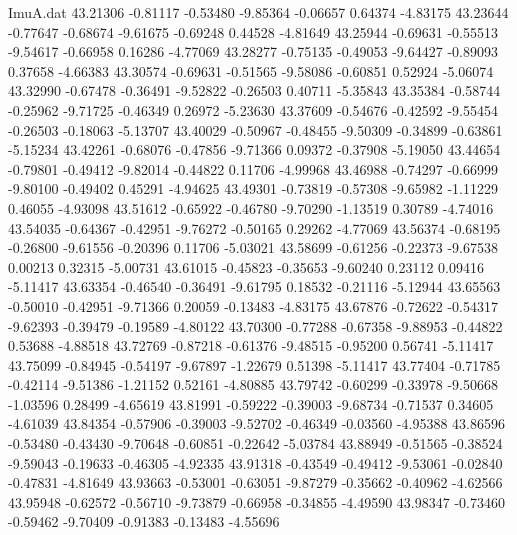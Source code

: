 \begin{filecontents}{ImuA.dat}
  43.21306   -0.81117   -0.53480   -9.85364   -0.06657    0.64374   -4.83175
  43.23644   -0.77647   -0.68674   -9.61675   -0.69248    0.44528   -4.81649
  43.25944   -0.69631   -0.55513   -9.54617   -0.66958    0.16286   -4.77069
  43.28277   -0.75135   -0.49053   -9.64427   -0.89093    0.37658   -4.66383
  43.30574   -0.69631   -0.51565   -9.58086   -0.60851    0.52924   -5.06074
  43.32990   -0.67478   -0.36491   -9.52822   -0.26503    0.40711   -5.35843
  43.35384   -0.58744   -0.25962   -9.71725   -0.46349    0.26972   -5.23630
  43.37609   -0.54676   -0.42592   -9.55454   -0.26503   -0.18063   -5.13707
  43.40029   -0.50967   -0.48455   -9.50309   -0.34899   -0.63861   -5.15234
  43.42261   -0.68076   -0.47856   -9.71366    0.09372   -0.37908   -5.19050
  43.44654   -0.79801   -0.49412   -9.82014   -0.44822    0.11706   -4.99968
  43.46988   -0.74297   -0.66999   -9.80100   -0.49402    0.45291   -4.94625
  43.49301   -0.73819   -0.57308   -9.65982   -1.11229    0.46055   -4.93098
  43.51612   -0.65922   -0.46780   -9.70290   -1.13519    0.30789   -4.74016
  43.54035   -0.64367   -0.42951   -9.76272   -0.50165    0.29262   -4.77069
  43.56374   -0.68195   -0.26800   -9.61556   -0.20396    0.11706   -5.03021
  43.58699   -0.61256   -0.22373   -9.67538    0.00213    0.32315   -5.00731
  43.61015   -0.45823   -0.35653   -9.60240    0.23112    0.09416   -5.11417
  43.63354   -0.46540   -0.36491   -9.61795    0.18532   -0.21116   -5.12944
  43.65563   -0.50010   -0.42951   -9.71366    0.20059   -0.13483   -4.83175
  43.67876   -0.72622   -0.54317   -9.62393   -0.39479   -0.19589   -4.80122
  43.70300   -0.77288   -0.67358   -9.88953   -0.44822    0.53688   -4.88518
  43.72769   -0.87218   -0.61376   -9.48515   -0.95200    0.56741   -5.11417
  43.75099   -0.84945   -0.54197   -9.67897   -1.22679    0.51398   -5.11417
  43.77404   -0.71785   -0.42114   -9.51386   -1.21152    0.52161   -4.80885
  43.79742   -0.60299   -0.33978   -9.50668   -1.03596    0.28499   -4.65619
  43.81991   -0.59222   -0.39003   -9.68734   -0.71537    0.34605   -4.61039
  43.84354   -0.57906   -0.39003   -9.52702   -0.46349   -0.03560   -4.95388
  43.86596   -0.53480   -0.43430   -9.70648   -0.60851   -0.22642   -5.03784
  43.88949   -0.51565   -0.38524   -9.59043   -0.19633   -0.46305   -4.92335
  43.91318   -0.43549   -0.49412   -9.53061   -0.02840   -0.47831   -4.81649
  43.93663   -0.53001   -0.63051   -9.87279   -0.35662   -0.40962   -4.62566
  43.95948   -0.62572   -0.56710   -9.73879   -0.66958   -0.34855   -4.49590
  43.98347   -0.73460   -0.59462   -9.70409   -0.91383   -0.13483   -4.55696

\end{filecontents}

